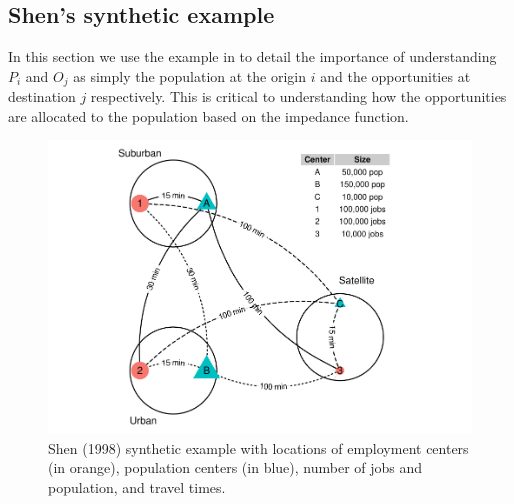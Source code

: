 \documentclass[]{elsarticle} %
\begin{document}
\hypertarget{shens-synthetic-example}{%
\subsection{Shen's synthetic example}\label{shens-synthetic-example}}

In this section we use the example in \citet{shen1998} to detail the
importance of understanding \(P_i\) and \(O_j\) as simply the population
at the origin \(i\) and the opportunities at destination \(j\)
respectively. This is critical to understanding how the opportunities
are allocated to the population based on the impedance function.

\begin{figure}

{\centering \includegraphics[width=1\linewidth]{Spatial-Availability-Refreshed_files/figure-latex/create-figure-with-toy-example-1} 

}

\caption{\label{fig:plot-toy-example} Shen (1998) synthetic example with locations of employment centers (in orange), population centers (in blue), number of jobs and population, and travel times.}\label{fig:create-figure-with-toy-example}
\end{figure}

 
  \providecommand{\huxb}[2]{\arrayrulecolor[RGB]{#1}\global\arrayrulewidth=#2pt}
  \providecommand{\huxvb}[2]{\color[RGB]{#1}\vrule width #2pt}
  \providecommand{\huxtpad}[1]{\rule{0pt}{#1}}
  \providecommand{\huxbpad}[1]{\rule[-#1]{0pt}{#1}}
\end{document}
